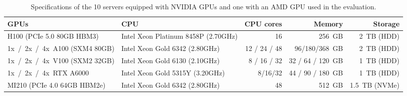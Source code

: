 %
\begin{table*}[t]
\centering
\setlength{\tabcolsep}{3pt} %
\renewcommand{\arraystretch}{1} %
\begin{tabular}{@{}llr|r|r@{}} 
\toprule
\textbf{GPUs} & \textbf{CPU} & \textbf{CPU cores} & \textbf{Memory} & \textbf{Storage} \\ 
\midrule
H100 (PCIe 5.0 80GB HBM3) & Intel Xeon Platinum 8458P (2.70GHz) & 16 & 256~GB & 2~TB (HDD) \\ 
1x~/~2x~/~4x~A100 (SXM4 80GB) & Intel Xeon Gold 6342 (2.80GHz) & 12 / 24 / 48 & 96/180/368~GB & 2~TB (HDD) \\ 
1x~/~2x~/~4x~V100 (SXM2 32GB) & Intel Xeon Gold 6130 (2.10GHz) & 8 / 16 / 32 & 32 / 64 / 120~GB & 1~TB (HDD) \\ 
1x~/~2x~/~4x~RTX A6000 & Intel Xeon Gold 5315Y (3.20GHz) & 8/16/32 & 44 / 90 / 180~GB & 1~TB (HDD) \\ 
MI210 (PCIe 4.0 64GB HBM2e) & Intel Xeon Gold 6342 (2.80GHz) & 48 & 512~GB & 1.5~TB (NVMe) \\ 
\bottomrule
\end{tabular}
\vspace{-.5em}
\caption{Specifications of the 10 servers equipped with NVIDIA GPUs and one with an AMD GPU used in the evaluation.}
\label{tab:server-configs}
\vspace{-1em}
\end{table*}
%
